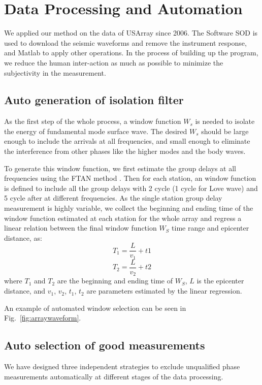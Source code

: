 \documentclass[referee]{gji}
\begin{document}
\section{Data Processing and Automation}
\label{sec:data_processing}
We applied our method on the data of USArray since 2006. The Software SOD \cite{Owens:2004sod} is used to download the seismic waveforms and remove the instrument response, and Matlab to apply other operations.
In the process of building up the program, we reduce the human inter-action as much as possible to minimize the subjectivity in the measurement.

\subsection{Auto generation of isolation filter}
As the first step of the whole process, a window function $W_s$ is needed to isolate the energy of fundamental mode surface wave. The desired $W_s$ should be large enough to include the arrivals at all frequencies, and small enough to eliminate the interference from other phases like the higher modes and the body waves. 

To generate this window function, we first estimate the group delays at all frequencies using the FTAN method \cite{Levshin:1992ve}. Then for each station, an window function is defined to include all the group delays with 2 cycle (1 cycle for Love wave) and 5 cycle after at different frequencies. As the single station group delay measurement is highly variable, we collect the beginning and ending time of the window function estimated at each station for the whole array and regress a linear relation between the final window function $W_S$ time range and epicenter distance, as:
\[
T_1 = \frac{L}{v_1} + t1
\]
\[
T_2 = \frac{L}{v_2} + t2
\]
where $T_1$ and $T_2$ are the beginning and ending time of $W_S$, $L$ is the epicenter distance, and $v_1$, $v_2$, $t_1$, $t_2$ are parameters estimated by the linear regression.

An example of automated window selection can be seen in Fig.~\ref{fig:arraywaveform}.

\subsection{Auto selection of good measurements}

We have designed three independent strategies to exclude unqualified phase measurements automatically at different stages of the data processing.
\end{document}
